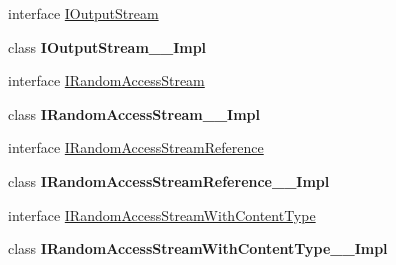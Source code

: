 \begin{DoxyCompactItemize}
\item 
interface \hyperlink{interface_windows_1_1_storage_1_1_streams_1_1_i_output_stream}{I\+Output\+Stream}
\item 
class {\bfseries I\+Output\+Stream\+\_\+\+\_\+\+Impl}
\item 
interface \hyperlink{interface_windows_1_1_storage_1_1_streams_1_1_i_random_access_stream}{I\+Random\+Access\+Stream}
\item 
class {\bfseries I\+Random\+Access\+Stream\+\_\+\+\_\+\+Impl}
\item 
interface \hyperlink{interface_windows_1_1_storage_1_1_streams_1_1_i_random_access_stream_reference}{I\+Random\+Access\+Stream\+Reference}
\item 
class {\bfseries I\+Random\+Access\+Stream\+Reference\+\_\+\+\_\+\+Impl}
\item 
interface \hyperlink{interface_windows_1_1_storage_1_1_streams_1_1_i_random_access_stream_with_content_type}{I\+Random\+Access\+Stream\+With\+Content\+Type}
\item 
class {\bfseries I\+Random\+Access\+Stream\+With\+Content\+Type\+\_\+\+\_\+\+Impl}
\end{DoxyCompactItemize}
